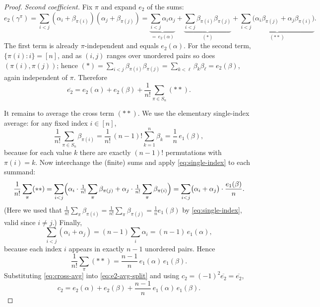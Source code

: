 \begin{proof}
\smallskip\noindent\emph{Second coefficient.}
Fix $\pi$ and expand $e_2$ of the sums:
\[
e_2(\gamma^\pi)=\sum_{i<j}(\alpha_i+\beta_{\pi(i)})(\alpha_j+\beta_{\pi(j)})
=\underbrace{\sum_{i<j}\alpha_i\alpha_j}_{=\,e_2(\alpha)}
+\underbrace{\sum_{i<j}\beta_{\pi(i)}\beta_{\pi(j)}}_{(\ast)}
+\underbrace{\sum_{i<j}\bigl(\alpha_i\beta_{\pi(j)}+\alpha_j\beta_{\pi(i)}\bigr)}_{(\ast\ast)} .
\]
The first term is already $\pi$-independent and equals $e_2(\alpha)$. For the
second term, $\{\pi(i):i\}=[n]$, and as $(i,j)$ ranges over unordered pairs so
does $(\pi(i),\pi(j))$; hence $(\ast)=\sum_{i<j}\beta_{\pi(i)}\beta_{\pi(j)}
=\sum_{k<\ell}\beta_k\beta_\ell=e_2(\beta)$, again independent of $\pi$. Therefore
\begin{equation}\label{eq:e2-avg-split}
\overline{e_2}=e_2(\alpha)+e_2(\beta)+\frac1{n!}\sum_{\pi\in S_n}(\ast\ast).
\end{equation}

It remains to average the cross term $(\ast\ast)$. We use the elementary
single-index average: for any fixed index $i\in[n]$,
\begin{equation}\label{eq:single-index}
\frac1{n!}\sum_{\pi\in S_n}\beta_{\pi(i)}
=\frac1{n!}\,(n-1)!\sum_{k=1}^n\beta_k
=\frac1n\,e_1(\beta),
\end{equation}
because for each value $k$ there are exactly $(n-1)!$ permutations with
$\pi(i)=k$. Now interchange the (finite) sums and apply \eqref{eq:single-index}
to each summand:
\[
\frac1{n!}\sum_{\pi}(\ast\ast)
=\sum_{i<j}\Bigl(\alpha_i\cdot\tfrac1{n!}\sum_\pi\beta_{\pi(j)}
+\alpha_j\cdot\tfrac1{n!}\sum_\pi\beta_{\pi(i)}\Bigr)
=\sum_{i<j}\bigl(\alpha_i+\alpha_j\bigr)\cdot\frac{e_1(\beta)}{n}.
\]
(Here we used that $\tfrac1{n!}\sum_\pi\beta_{\pi(i)}=\tfrac1{n!}\sum_\pi\beta_{\pi(j)}=\tfrac1n e_1(\beta)$
by \eqref{eq:single-index}, valid since $i\ne j$.) Finally,
\[
\sum_{i<j}(\alpha_i+\alpha_j)=(n-1)\sum_{i}\alpha_i=(n-1)\,e_1(\alpha),
\]
because each index $i$ appears in exactly $n-1$ unordered pairs. Hence
\begin{equation}\label{eq:cross-avg}
\frac1{n!}\sum_{\pi}(\ast\ast)=\frac{n-1}{n}\,e_1(\alpha)\,e_1(\beta).
\end{equation}
Substituting \eqref{eq:cross-avg} into \eqref{eq:e2-avg-split} and using
$c_2=(-1)^2\overline{e_2}=\overline{e_2}$,
\begin{equation}\label{eq:c2}
c_2=e_2(\alpha)+e_2(\beta)+\frac{n-1}{n}\,e_1(\alpha)\,e_1(\beta).
\end{equation}


\end{proof}
